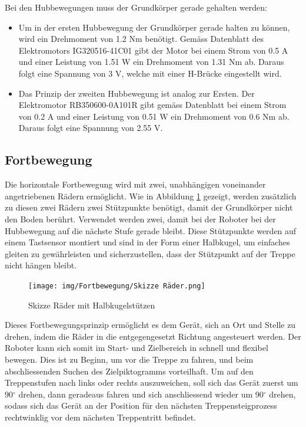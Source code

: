 \newpage
Bei den Hubbewegungen muss der Grundkörper gerade gehalten werden:
\begin{itemize}
    \item Um in der ersten Hubbewegung der Grundkörper gerade halten zu können, wird ein Drehmoment von 1.2 Nm benötigt. Gemäss Datenblatt des Elektromotors IG320516-41C01 gibt der Motor bei einem Strom von 0.5 A und einer Leistung von 1.51 W ein Drehmoment von 1.31 Nm ab. Daraus folgt eine Spannung von 3 V, welche mit einer H-Brücke eingestellt wird.
    \item Das Prinzip der zweiten Hubbewegung ist analog zur Ersten. Der Elektromotor RB350600-0A101R gibt gemäss Datenblatt bei einem Strom von 0.2 A und einer Leistung von 0.51 W ein Drehmoment von 0.6 Nm ab. Daraus folgt eine Spannung von 2.55 V.
 \end{itemize}


\newpage
\subsection{Fortbewegung}
\label{sec:fortbewegung}
Die horizontale Fortbewegung wird mit zwei, unabhängigen voneinander angetriebenen Rädern ermöglicht. Wie in Abbildung \ref{fig:skizze-raeder} gezeigt, werden zusätzlich zu diesen zwei Rädern zwei Stützpunkte benötigt, damit der Grundkörper nicht den Boden berührt. Verwendet werden zwei, damit bei der Roboter bei der Hubbewegung auf die nächste Stufe gerade bleibt. Diese Stützpunkte werden auf einem Tastsensor montiert und sind in der Form einer Halbkugel, um einfaches gleiten zu gewährleisten und sicherzustellen, dass der Stützpunkt auf der Treppe nicht hängen bleibt.

\begin{figure}[H]
  \texttt{[image: img/Fortbewegung/Skizze Räder.png]}
  \centering
  \caption{Skizze Räder mit Halbkugelstützen}
  \label{fig:skizze-raeder}
\end{figure}

Dieses Fortbewegungsprinzip ermöglicht es dem Gerät, sich an Ort und Stelle zu drehen, indem die Räder in die entgegengesetzt Richtung angesteuert werden. Der Roboter kann sich somit im Start- und Zielbereich in schnell und flexibel bewegen. Dies ist zu Beginn, um vor die Treppe zu fahren, und beim abschliessenden Suchen des Zielpiktogramms vorteilhaft. Um auf den Treppenstufen nach links oder rechts auszuweichen, soll sich das Gerät zuerst um 90$^\circ$ drehen, dann geradeaus fahren und sich anschliessend wieder um 90$^\circ$ drehen, sodass sich das Gerät an der Position für den nächsten Treppensteigprozess rechtwinklig vor dem nächsten Treppentritt befindet.

